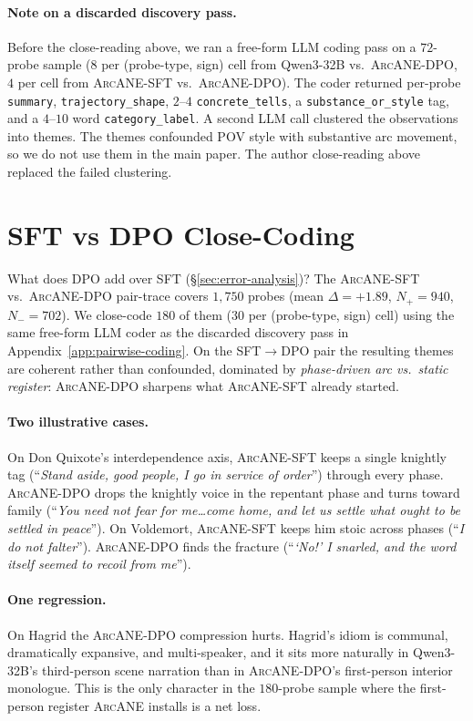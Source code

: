 \documentclass[11pt]{article}
\newcommand{\ours}{\textsc{ArcANE}}
\begin{document}
\paragraph{Note on a discarded discovery pass.}
Before the close-reading above, we ran a free-form LLM coding pass on a $72$-probe sample ($8$ per (probe-type, sign) cell from Qwen3-32B vs.\ \ours{}-DPO, $4$ per cell from \ours{}-SFT vs.\ \ours{}-DPO). The coder returned per-probe \texttt{summary}, \texttt{trajectory\_shape}, $2$--$4$ \texttt{concrete\_tells}, a \texttt{substance\_or\_style} tag, and a $4$--$10$ word \texttt{category\_label}. A second LLM call clustered the observations into themes. The themes confounded POV style with substantive arc movement, so we do not use them in the main paper. The author close-reading above replaced the failed clustering.


\section{SFT vs DPO Close-Coding\label{app:sft-vs-dpo}}

What does DPO add over SFT (\S\ref{sec:error-analysis})? The \ours{}-SFT vs.\ \ours{}-DPO pair-trace covers $1{,}750$ probes (mean $\Delta{=}{+}1.89$, $N_{+}{=}940$, $N_{-}{=}702$). We close-code $180$ of them ($30$ per (probe-type, sign) cell) using the same free-form LLM coder as the discarded discovery pass in Appendix~\ref{app:pairwise-coding}. On the SFT$\to$DPO pair the resulting themes are coherent rather than confounded, dominated by \emph{phase-driven arc vs.\ static register}: \ours{}-DPO sharpens what \ours{}-SFT already started.

\paragraph{Two illustrative cases.}
On Don Quixote's interdependence axis, \ours{}-SFT keeps a single knightly tag (``\emph{Stand aside, good people, I go in service of order}'') through every phase. \ours{}-DPO drops the knightly voice in the repentant phase and turns toward family (``\emph{You need not fear for me\ldots come home, and let us settle what ought to be settled in peace}''). On Voldemort, \ours{}-SFT keeps him stoic across phases (``\emph{I do not falter}''). \ours{}-DPO finds the fracture (``\emph{`No!' I snarled, and the word itself seemed to recoil from me}'').

\paragraph{One regression.}
On Hagrid the \ours{}-DPO compression hurts. Hagrid's idiom is communal, dramatically expansive, and multi-speaker, and it sits more naturally in Qwen3-32B's third-person scene narration than in \ours{}-DPO's first-person interior monologue. This is the only character in the $180$-probe sample where the first-person register \ours{} installs is a net loss.
\end{document}
